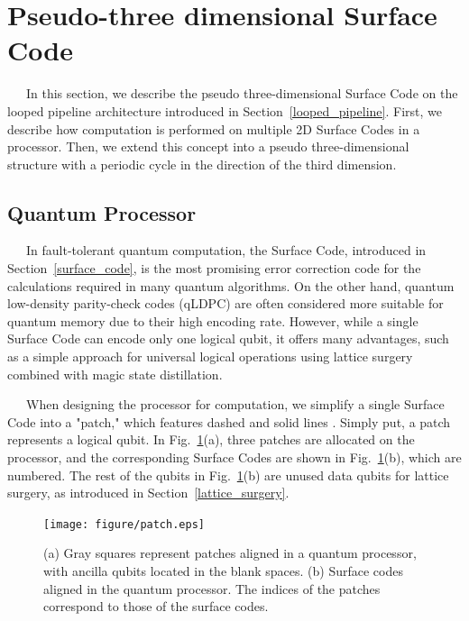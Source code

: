 \documentclass[a4paper,11pt]{ltjsarticle}
\begin{document}
\section{Pseudo-three dimensional Surface Code}\label{pseudo-three-dimensional_surface_code}{
    \ \ \ In this section, we describe the pseudo three-dimensional Surface Code on the looped pipeline architecture introduced in Section~\ref{looped_pipeline}. First, we describe how computation is performed on multiple 2D Surface Codes in a processor. Then, we extend this concept into a pseudo three-dimensional structure with a periodic cycle in the direction of the third dimension.

    \subsection{Quantum Processor}{
        \ \ \ In fault-tolerant quantum computation, the Surface Code, introduced in Section~\ref{surface_code}, is the most promising error correction code for the calculations required in many quantum algorithms. On the other hand, quantum low-density parity-check codes (qLDPC) are often considered more suitable for quantum memory due to their high encoding rate. However, while a single Surface Code can encode only one logical qubit, it offers many advantages, such as a simple approach for universal logical operations using lattice surgery combined with magic state distillation.

        \ \ \ When designing the processor for computation, we simplify a single Surface Code into a "patch," which features dashed and solid lines \cite{litinski2019-2}. Simply put, a patch represents a logical qubit. In Fig.~\ref{patch}(a), three patches are allocated on the processor, and the corresponding Surface Codes are shown in Fig.~\ref{patch}(b), which are numbered. The rest of the qubits in Fig.~\ref{patch}(b) are unused data qubits for lattice surgery, as introduced in Section~\ref{lattice_surgery}.
        \begin{figure}[h]
            \centering
            \texttt{[image: figure/patch.eps]}
            \vspace{0pt}\caption{(a) Gray squares represent patches aligned in a quantum processor, with ancilla qubits located in the blank spaces. (b) Surface codes aligned in the quantum processor. The indices of the patches correspond to those of the surface codes.}
            \label{patch}
            \vspace{-10pt}
        \end{figure}

}}
\end{document}
